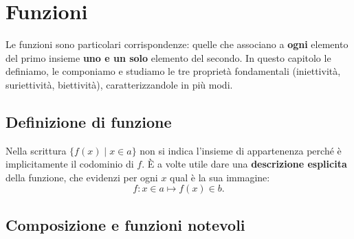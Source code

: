 \chapter{Funzioni}\label{cap:funzioni}

Le funzioni sono particolari corrispondenze: quelle che associano a \textbf{ogni} elemento del primo insieme
\textbf{uno e un solo} elemento del secondo. In questo capitolo le definiamo, le componiamo e studiamo le tre
proprietà fondamentali (iniettività, suriettività, biettività), caratterizzandole in più modi.

\section{Definizione di funzione}\label{sec:def-funzione}


Nella scrittura $\{f(x) \mid x \in a\}$ non si indica l'insieme di appartenenza perché è implicitamente il codominio di $f$.
È a volte utile dare una \textbf{descrizione esplicita} della funzione, che evidenzi per ogni $x$ qual è la sua immagine:
\[ f \colon x \in a \mapsto f(x) \in b. \]

\section{Composizione e funzioni notevoli}\label{sec:composizione}

